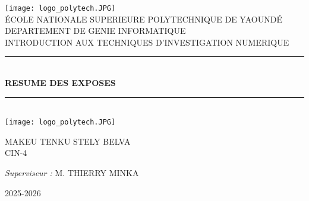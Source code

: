 \documentclass[12pt, openany]{report}
\newcommand{\HRule}{\rule{\linewidth}{0.5mm}}
\begin{document}
	
	\begin{titlepage}
		\begin{sffamily}
			\begin{center}
				
				\texttt{[image: logo\_polytech.JPG]}~\\[1.5cm]
				
				\textsc{\LARGE ÉCOLE NATIONALE SUPERIEURE POLYTECHNIQUE DE YAOUNDÉ }\\[2cm]
				
				\textsc{\LARGE DEPARTEMENT DE GENIE INFORMATIQUE }\\[2cm]
				
				\textsc{\LARGE INTRODUCTION AUX TECHNIQUES D'INVESTIGATION NUMERIQUE }\\[1.5cm]
				
				\HRule \\[0.4cm]
				{ \huge \bfseries  RESUME DES EXPOSES\\[0.4cm] }
				
				\HRule \\[2cm]
				\texttt{[image: logo\_polytech.JPG]}
				\\[2cm]
				
				\begin{minipage}{0.4\textwidth}
					\begin{flushleft} \large
						MAKEU TENKU STELY BELVA\\
						CIN-4\\
					\end{flushleft}
				\end{minipage}
				\begin{minipage}{0.4\textwidth}
					\begin{flushright} \large
						\emph{Superviseur :} M.  \textsc{THIERRY MINKA}\\
						
					\end{flushright}
				\end{minipage}
				
				\vfill
				
				{\large 2025-2026}
				
			\end{center}
		\end{sffamily}
	\end{titlepage}
\end{document}
